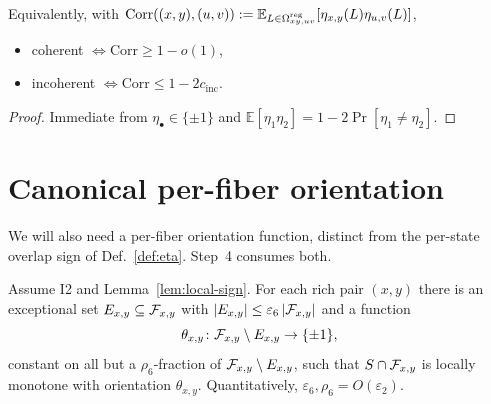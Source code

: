 \begin{proposition}\label{prop:correlation}
Equivalently, with
$\mathrm{Corr}((x,y),(u,v)) := \mathbb{E}_{L\in\Omega^{\mathrm{reg}}_{xy,uv}}[\eta_{x,y}(L)\eta_{u,v}(L)]$,
\begin{itemize}[nosep]
  \item coherent $\iff \mathrm{Corr}\ge 1-o(1)$,
  \item incoherent $\iff \mathrm{Corr}\le 1-2c_{\mathrm{inc}}$.
\end{itemize}
\end{proposition}

\begin{proof}
Immediate from $\eta_{\bullet}\in\{\pm 1\}$ and
$\mathbb{E}[\eta_1\eta_2]=1-2\Pr[\eta_1\ne \eta_2]$.
\end{proof}

\section{Canonical per-fiber orientation}\label{sec:canonical}

We will also need a per-fiber orientation function, distinct from the per-state
overlap sign of Def.~\ref{def:eta}. Step~4 consumes both.

\begin{theorem}\label{thm:canonical-orientation}
Assume \textsc{I2} and Lemma~\ref{lem:local-sign}. For each rich pair
$(x,y)$ there is an exceptional set $E_{x,y}\subseteq\mathcal{F}_{x,y}$ with
$|E_{x,y}|\le \varepsilon_6\,|\mathcal{F}_{x,y}|$ and a function
\[
  \theta_{x,y}\colon \mathcal{F}_{x,y}\setminus E_{x,y}\to\{\pm 1\},
\]
constant on all but a $\rho_6$-fraction of $\mathcal{F}_{x,y}\setminus E_{x,y}$, such that
$S\cap\mathcal{F}_{x,y}$ is locally monotone with orientation $\theta_{x,y}$.
Quantitatively, $\varepsilon_6, \rho_6 = O(\varepsilon_2)$.
\end{theorem}

